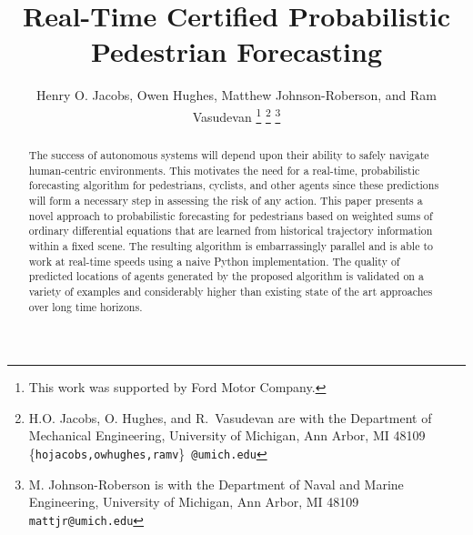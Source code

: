 \documentclass[letterpaper,10pt,conference]{ieeeconf}
\begin{document}
\title{Real-Time Certified Probabilistic Pedestrian Forecasting}

\author{Henry O. Jacobs, Owen Hughes, Matthew Johnson-Roberson, and Ram Vasudevan
\thanks{This work was supported by Ford Motor Company.}
 \thanks{ H.O. Jacobs, O. Hughes, and R.~Vasudevan are with the Department of Mechanical Engineering, University of Michigan, Ann Arbor, MI 48109
{\scriptsize \{\texttt{hojacobs,owhughes,ramv}\}~\texttt{@umich.edu}}}
\thanks{M. Johnson-Roberson is with the Department of Naval and Marine Engineering, University of Michigan, Ann Arbor, MI 48109\newline
{\scriptsize \texttt{mattjr@umich.edu}}}
}



\maketitle

\begin{abstract}
The success of autonomous systems will depend upon their ability to safely navigate human-centric environments.
This motivates the need for a real-time, probabilistic forecasting algorithm for pedestrians, cyclists, and other agents since these predictions will form a necessary step in assessing the risk of any action.
This paper presents a novel approach to probabilistic forecasting for pedestrians based on weighted sums of ordinary differential equations that are learned from historical trajectory information within a fixed scene.
The resulting algorithm is embarrassingly parallel and is able to work at real-time speeds using a naive Python implementation.
The quality of predicted locations of agents generated by the proposed algorithm is validated on a variety of examples and considerably higher than existing state of the art approaches over long time horizons.
\end{abstract}
\end{document}

